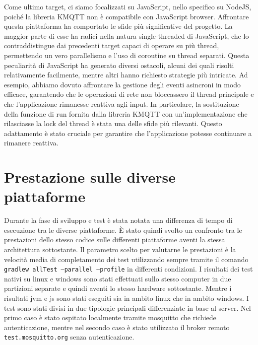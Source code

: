 \documentclass[12pt,a4paper,openright,twoside]{book}
\begin{document}
Come ultimo target, ci siamo focalizzati su JavaScript, nello specifico su NodeJS, poiché la libreria KMQTT non è compatibile con JavaScript browser. 
Affrontare questa piattaforma ha comportato le sfide più significative del progetto. La maggior parte di esse ha radici nella natura single-threaded di JavaScript, 
che lo contraddistingue dai precedenti target capaci di operare su più thread, permettendo un vero parallelismo e l'uso di coroutine su thread separati.
Questa peculiarità di JavaScript ha generato diversi ostacoli, alcuni dei quali risolti relativamente facilmente, mentre altri hanno richiesto strategie più intricate. 
Ad esempio, abbiamo dovuto affrontare la gestione degli eventi asincroni in modo efficace, garantendo che le operazioni di rete non bloccassero il thread principale e 
che l'applicazione rimanesse reattiva agli input.
In particolare, la sostituzione della funzione di run fornita dalla libreria KMQTT con un'implementazione che rilasciasse la lock del thread è stata una delle sfide più 
rilevanti. Questo adattamento è stato cruciale per garantire che l'applicazione potesse continuare a rimanere reattiva.

\section{Prestazione sulle diverse piattaforme}

Durante la fase di sviluppo e test è stata notata una differenza di tempo di esecuzione tra le diverse piattaforme. È stato quindi svolto un confronto tra le prestazioni 
dello stesso codice sulle differenti piattaforme aventi la stessa architettura sottostante.
Il parametro scelto per valutarne le prestazioni è la velocità media di completamento dei test utilizzando sempre tramite il comando \texttt{gradlew allTest --parallel --profile} 
in differenti condizioni.
I risultati dei test nativi su linux e windows sono stati effettuati sullo stesso computer in due partizioni separate e quindi aventi lo stesso hardware sottostante. 
Mentre i risultati jvm e js sono stati eseguiti sia in ambito linux che in ambito windows.
I test sono stati divisi in due tipologie principali differenziate in base al server. Nel primo caso è stato ospitato localmente tramite mosquitto che richiede autenticazione, 
mentre nel secondo caso è stato utilizzato il broker remoto \texttt{test.mosquitto.org} senza autenticazione.
\end{document}
